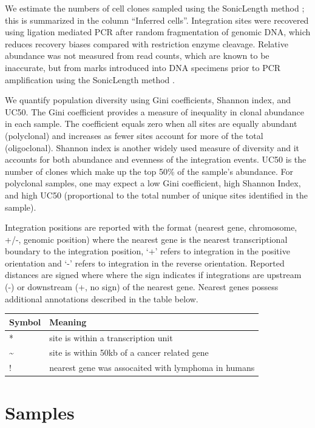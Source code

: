 \documentclass[]{article}
\begin{document}
We estimate the numbers of cell clones sampled using the SonicLength
method \citet{berry2012}; this is summarized in the column ``Inferred
cells''. Integration sites were recovered using ligation mediated PCR
after random fragmentation of genomic DNA, which reduces recovery biases
compared with restriction enzyme cleavage. Relative abundance was not
measured from read counts, which are known to be inaccurate, but from
marks introduced into DNA specimens prior to PCR amplification using the
SonicLength method \citet{berry2012}.

We quantify population diversity using Gini coefficients, Shannon index,
and UC50. The Gini coefficient provides a measure of inequality in
clonal abundance in each sample. The coefficient equals zero when all
sites are equally abundant (polyclonal) and increases as fewer sites
account for more of the total (oligoclonal). Shannon index is another
widely used measure of diversity and it accounts for both abundance and
evenness of the integration events. UC50 is the number of clones which
make up the top 50\% of the sample's abundance. For polyclonal samples,
one may expect a low Gini coefficient, high Shannon Index, and high UC50
(proportional to the total number of unique sites identified in the
sample).

Integration positions are reported with the format (nearest gene,
chromosome, +/-, genomic position) where the nearest gene is the nearest
transcriptional boundary to the integration position, `+' refers to
integration in the positive orientation and `-' refers to integration in
the reverse orientation. Reported distances are signed where where the
sign indicates if integrations are upstream (-) or downstream (+, no
sign) of the nearest gene. Nearest genes possess additional annotations
described in the table below.

\begin{table}[ht]
\centering
\begin{tabular}{ll}
  \hline
Symbol & Meaning \\ 
  \hline
* & site is within a transcription unit \\ 
  \~{} & site is within 50kb of a cancer related gene \\ 
  ! & nearest gene was assocaited with lymphoma in humans \\ 
   \hline
\end{tabular}
\end{table}

\hypertarget{samples}{%
\section{Samples}\label{samples}}
\end{document}
